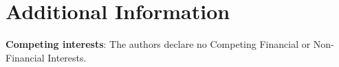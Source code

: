 \documentclass[final,3p,times]{elsarticle}
\begin{document}
% 
%
\section*{Additional Information}

\textbf{Competing interests}: The authors declare no Competing Financial or 
Non-Financial Interests.

% 
%


\end{document}

